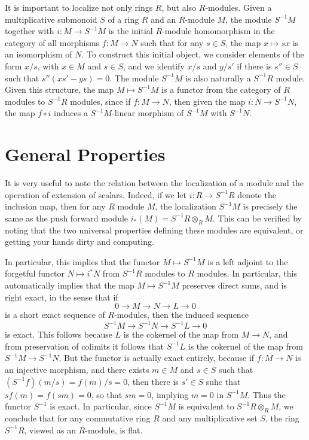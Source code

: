 It is important to localize not only rings $R$, but also $R$-modules. Given a multiplicative submonoid $S$ of a ring $R$ and an $R$-module $M$, the module $S^{-1}M$ together with $i: M \to S^{-1}M$ is the initial $R$-module homomorphism in the category of all morphisms $f: M \to N$ such that for any $s \in S$, the map $x \mapsto sx$ is an isomorphism of $N$. To construct this initial object, we consider elements of the form $x/s$, with $x \in M$ and $s \in S$, and we identify $x/s$ and $y/s'$ if there is $s'' \in S$ such that $s''(xs' - ys) = 0$. The module $S^{-1}M$ is also naturally a $S^{-1}R$ module. Given this structure, the map $M \mapsto S^{-1}M$ is a functor from the category of $R$ modules to $S^{-1}R$ modules, since if $f: M \to N$, then given the map $i: N \to S^{-1}N$, the map $f \circ i$ induces a $S^{-1}M$-linear morphism of $S^{-1}M$ with $S^{-1}N$.

\section{General Properties}

It is very useful to note the relation between the localization of a module and the operation of extension of scalars. Indeed, if we let $i: R \to S^{-1}R$ denote the inclusion map, then for any $R$ module $M$, the localization $S^{-1}M$ is precisely the same as the push forward module $i_*(M) = S^{-1}R \otimes_R M$. This can be verified by noting that the two universal properties defining these modules are equivalent, or getting your hands dirty and computing.

In particular, this implies that the functor $M \mapsto S^{-1}M$ is a left adjoint to the forgetful functor $N \mapsto i^* N$ from $S^{-1}R$ modules to $R$ modules. In particular, this automatically implies that the map $M \mapsto S^{-1}M$ preserves direct sums, and is right exact, in the sense that if
%
\[ 0 \to M \to N \to L \to 0 \]
%
is a short exact sequence of $R$-modules, then the induced sequence
%
\[ S^{-1}M \to S^{-1}N \to S^{-1}L \to 0 \]
%
is exact. This follows because $L$ is the cokernel of the map from $M \to N$, and from preservation of colimits it follows that $S^{-1}L$ is the cokernel of the map from $S^{-1}M \to S^{-1}N$. But the functor is actually exact entirely, because if $f: M \to N$ is an injective morphism, and there exists $m \in M$ and $s \in S$ such that $(S^{-1}f)(m/s) = f(m)/s = 0$, then there is $s' \in S$ suhc that $s f(m) = f(sm) = 0$, so that $sm = 0$, implying $m = 0$ in $S^{-1}M$. Thus the functor $S^{-1}$ is exact. In particular, since $S^{-1}M$ is equivalent to $S^{-1}R \otimes_R M$, we conclude that for any commutative ring $R$ and any multiplicative set $S$, the ring $S^{-1}R$, viewed as an $R$-module, is flat.

